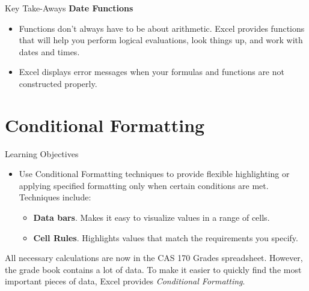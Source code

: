 \begin{center}
	\begin{tkwbox}{Key Take-Aways}
		\textbf{Date Functions}
		\\
		\begin{itemize}
			\setlength{\itemsep}{0pt}
			\setlength{\parskip}{0pt}
			\setlength{\parsep}{0pt}

			\item Functions don't always have to be about arithmetic. Excel provides functions that will help you perform logical evaluations, look things up, and work with dates and times.
			\item Excel displays error messages when your formulas and functions are not constructed properly.
			
		\end{itemize}
	\end{tkwbox}
\end{center}

\section{Conditional Formatting}

\begin{center}
	\begin{objbox}{Learning Objectives}
		\begin{itemize}
			\setlength{\itemsep}{0pt}
			\setlength{\parskip}{0pt}
			\setlength{\parsep}{0pt}

			\item Use Conditional Formatting techniques to provide flexible highlighting or applying specified formatting only when certain conditions are met. Techniques include:

			\begin{itemize}			
				\item \textbf{Data bars}. Makes it easy to visualize values in a range of cells.
				\item \textbf{Cell Rules}. Highlights values that match the requirements you specify.
			\end{itemize}

		\end{itemize}
	\end{objbox}
\end{center}

All necessary calculations are now in the CAS 170 Grades spreadsheet. However, the grade book contains a lot of data. To make it easier to quickly find the most important pieces of data, Excel provides \textit{Conditional Formatting}.

